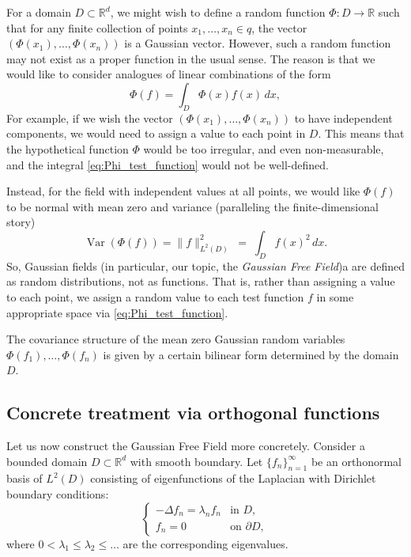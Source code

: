 \documentclass[letterpaper,11pt,oneside,reqno]{article}
\numberwithin{equation}{section}
\theoremstyle{definition}
\begin{document}
For a domain $D \subset \mathbb{R}^d$, we might wish to
define a random function $\Phi: D \rightarrow \mathbb{R}$
such that for any finite collection of points $x_1, \ldots,
x_n \in q$, the vector $(\Phi(x_1), \ldots, \Phi(x_n))$ is a
Gaussian vector. However, such a random function may not
exist as a proper function in the usual sense.
The reason is that we would like to consider analogues of linear combinations 
of the form
\begin{equation}
	\label{eq:Phi_test_function}
    \Phi(f) = \int_D \Phi(x) f(x) \, dx,
\end{equation}
For example, if we wish the vector $(\Phi(x_1), \ldots, \Phi(x_n))$ to have independent components, we would need to assign a value to each point in $D$. This means that the hypothetical function $\Phi$ would be too irregular, and even non-measurable, and the integral
\eqref{eq:Phi_test_function} would not be well-defined.

Instead, for the field with independent values at all points, we would like $\Phi(f)$ to be normal 
with mean zero and variance (paralleling the finite-dimensional story)
\begin{equation*}
	\operatorname{\mathrm{Var}}\left(  
	\Phi(f)\right) = \|f\|^2_{L^2(D)} \;=\; \int_D f(x)^2 \, dx.
\end{equation*}
So, Gaussian fields (in particular, our topic, the \emph{Gaussian Free Field})a
are defined as random distributions, not as functions.
That is, rather than assigning a value to each point, 
we assign a random value to each test function $f$ in some appropriate space
via \eqref{eq:Phi_test_function}.

The covariance structure of the mean zero Gaussian random variables
$\Phi(f_1), \ldots, \Phi(f_n)$ is given by a certain bilinear
form determined by the domain $D$.


\subsection{Concrete treatment via orthogonal functions}

Let us now construct the Gaussian Free Field more concretely. Consider a bounded domain $D \subset \mathbb{R}^d$ with smooth boundary. Let $\{f_n\}_{n=1}^{\infty}$ be an orthonormal basis of $L^2(D)$ consisting of eigenfunctions of the Laplacian with Dirichlet boundary conditions:
\begin{equation}
    \begin{cases}
        -\Delta f_n = \lambda_n f_n & \text{in } D, \\
        f_n = 0 & \text{on } \partial D,
    \end{cases}
\end{equation}
where $0 < \lambda_1 \leq \lambda_2 \leq \ldots$ are the corresponding eigenvalues.
\end{document}

